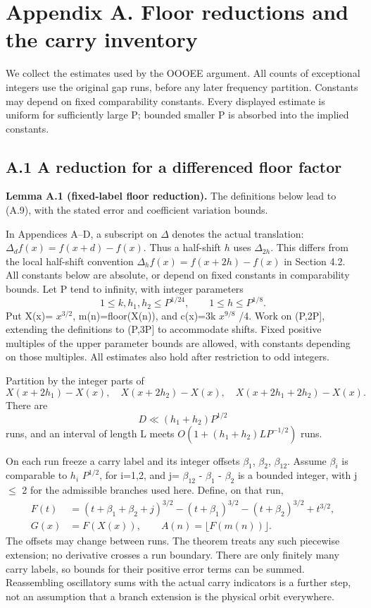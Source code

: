 \documentclass[11pt,a4paper]{article}
\begin{document}
\section{Appendix A. Floor reductions and the carry
inventory}\label{appendix-a.-floor-reductions-and-the-carry-inventory}

We collect the estimates used by the OOOEE argument. All counts of
exceptional integers use the original gap runs, before any later
frequency partition. Constants may depend on fixed comparability
constants. Every displayed estimate is uniform for sufficiently large P;
bounded smaller P is absorbed into the implied constants.


\subsection{A.1 A reduction for a differenced floor
factor}\label{a.1-a-reduction-for-a-differenced-floor-factor}

\textbf{Lemma A.1 (fixed-label floor reduction).} The definitions below
lead to (A.9), with the stated error and coefficient variation bounds.

In Appendices A--D, a subscript on \(\Delta\) denotes the actual
translation: \(\Delta_d f(x)=f(x+d)-f(x)\). Thus a half-shift \(h\) uses
\(\Delta_{2h}\). This differs from the local half-shift convention
\(\Delta_h f(x)=f(x+2h)-f(x)\) in Section 4.2. All constants below are
absolute, or depend on fixed constants in comparability bounds. Let P
tend to infinity, with integer parameters \[
1\le k,h_1,h_2\le P^{1/24},\qquad 1\le h\le P^{1/8}.
\] Put X(x)= \(x^{3/2}\), m(n)=floor(X(n)), and c(x)=3k \(x^{9/8}\) /4.
Work on (P,2P{]}, extending the definitions to (P,3P{]} to accommodate
shifts. Fixed positive multiples of the upper parameter bounds are
allowed, with constants depending on those multiples. All estimates also
hold after restriction to odd integers.

Partition by the integer parts of \[
X(x+2h_1)-X(x),\quad X(x+2h_2)-X(x),\quad
X(x+2h_1+2h_2)-X(x).
\] There are \[
D\ll (h_1+h_2)P^{1/2}
\] runs, and an interval of length L meets \(O(1+(h_1+h_2)L P^{-1/2})\)
runs.

On each run freeze a carry label and its integer offsets \(\beta_1\),
\(\beta_2\), \(\beta_{12}\). Assume \(\beta_i\) is comparable to \(h_i\)
\(P^{1/2}\), for i=1,2, and j= \(\beta_{12}\) - \(\beta_1\) -
\(\beta_2\) is a bounded integer, with \textbar j\textbar{} \(\le\) 2
for the admissible branches used here. Define, on that run, \[
\begin{split}
F(t)&=(t+\beta_1+\beta_2+j)^{3/2}
-(t+\beta_1)^{3/2}-(t+\beta_2)^{3/2}+t^{3/2},\\
G(x)&=F(X(x)),\qquad A(n)=\lfloor F(m(n))\rfloor.
\end{split}
\] The offsets may change between runs. The theorem treats any such
piecewise extension; no derivative crosses a run boundary. There are
only finitely many carry labels, so bounds for their positive error
terms can be summed. Reassembling oscillatory sums with the actual carry
indicators is a further step, not an assumption that a branch extension
is the physical orbit everywhere.
\end{document}
